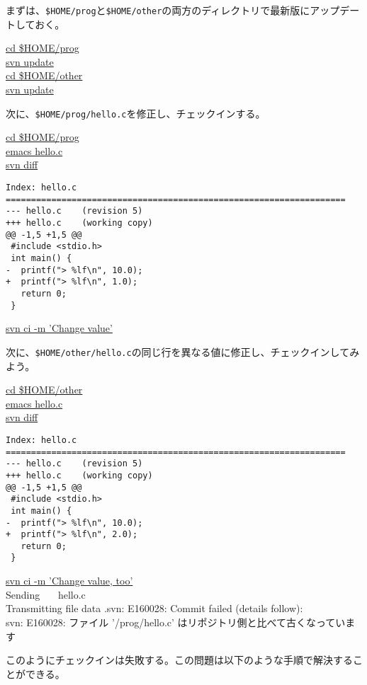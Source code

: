 まずは、{\tt \$HOME/prog}と{\tt \$HOME/other}の両方のディレクトリで最新版にアップデートしておく。
\begin{commandline2}
\prompt \underline{cd \$HOME/prog} \\
\prompt \underline{svn update} \\
\prompt \underline{cd \$HOME/other} \\
\prompt \underline{svn update}
\end{commandline2} \noindent
次に、{\tt \$HOME/prog/hello.c}を修正し、チェックインする。
\begin{commandline2}
\prompt \underline{cd \$HOME/prog} \\
\prompt \underline{emacs hello.c} \\
\prompt \underline{svn diff}
\vspace*{-.7em} 
\begin{verbatim}
Index: hello.c
===================================================================
--- hello.c    (revision 5)
+++ hello.c    (working copy)
@@ -1,5 +1,5 @@
 #include <stdio.h>
 int main() {
-  printf("> %lf\n", 10.0);
+  printf("> %lf\n", 1.0);
   return 0;
 }
\end{verbatim}
\vspace*{-.7em} 
\prompt \underline{svn ci -m 'Change value'}
\end{commandline2} \noindent
次に、{\tt \$HOME/other/hello.c}の同じ行を異なる値に修正し、チェックインしてみよう。
\begin{commandline2}
\prompt \underline{cd \$HOME/other} \\
\prompt \underline{emacs hello.c} \\
\prompt \underline{svn diff}
\vspace*{-.7em} 
\begin{verbatim}
Index: hello.c
===================================================================
--- hello.c    (revision 5)
+++ hello.c    (working copy)
@@ -1,5 +1,5 @@
 #include <stdio.h>
 int main() {
-  printf("> %lf\n", 10.0);
+  printf("> %lf\n", 2.0);
   return 0;
 }
\end{verbatim}
\vspace*{-.7em} 
\prompt \underline{svn ci -m 'Change value, too'} \\
Sending \ \ \ hello.c \\
Transmitting file data .svn: E160028: Commit failed (details follow): \\
svn: E160028: ファイル '/prog/hello.c' はリポジトリ側と比べて古くなっています
\end{commandline2} \noindent
このようにチェックインは失敗する。この問題は以下のような手順で解決することができる。

